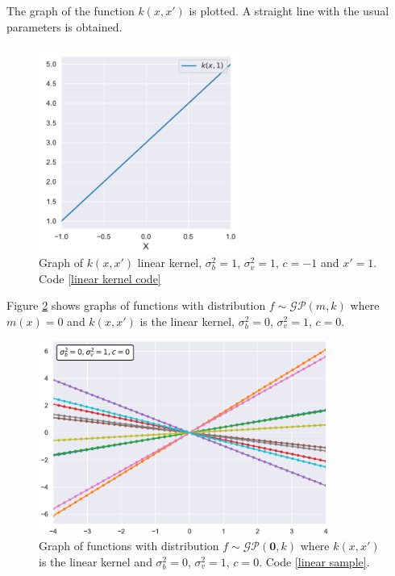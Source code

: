 The graph of the function $k(x,x')$ is plotted. A straight line with the usual parameters is obtained.
\begin{figure}[h]
    \centering
    \includegraphics[width=0.6\textwidth]{images/Gaussian process/Linear Kernel.pdf}
    \caption{Graph of $k(x,x')$ linear kernel, $\sigma_b^2=1$, $\sigma_v^2=1$, $c=-1$ and $x'=1$. Code \ref{linear kernel code}}
    \label{linear kernel}
\end{figure}

\newpage

Figure \ref{10 sample linear kernel zero mean} shows graphs of functions with distribution $f\sim \mathcal{GP}(m,k)$ where $m(x)=0$ and $k(x,x')$ is the linear kernel, $\sigma_b^2=0$, $\sigma_v^2=1$, $c=0$.



\begin{figure}[h]
    \centering
    \includegraphics[width=0.85\textwidth]{images/Gaussian process/Linear sample.pdf}
    \caption{Graph of functions with distribution  $f\sim \mathcal{GP}(\bm{0},k)$ where $k(x,x')$ is the linear kernel and $\sigma_b^2=0$, $\sigma_v^2=1$, $c=0$. Code \ref{linear sample}.}
    \label{10 sample linear kernel zero mean}
\end{figure}

